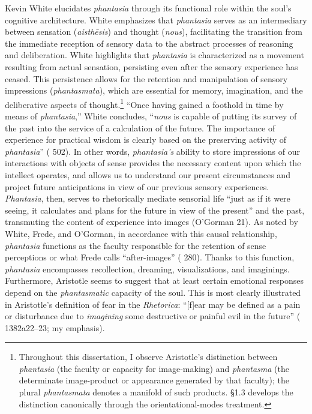 \documentclass{article}
\begin{document}
Kevin White elucidates \textit{phantasia} through its functional role within the soul's cognitive architecture. White emphasizes that \textit{phantasia} serves as an intermediary between sensation (\textit{aisthēsis}) and thought (\textit{nous}), facilitating the transition from the immediate reception of sensory data to the abstract processes of reasoning and deliberation. White highlights that \textit{phantasia} is characterized as a movement resulting from actual sensation, persisting even after the sensory experience has ceased. This persistence allows for the retention and manipulation of sensory impressions (\textit{phantasmata}), which are essential for memory, imagination, and the deliberative aspects of thought.\footnote{Throughout this dissertation, I observe Aristotle's distinction between \textit{phantasia} (the faculty or capacity for image-making) and \textit{phantasma} (the determinate image-product or appearance generated by that faculty); the plural \textit{phantasmata} denotes a manifold of such products. \S1.3 develops the distinction canonically through the orientational-modes treatment.} ``Once having gained a foothold in time by means of \textit{phantasia},'' White concludes, ``\textit{nous} is capable of putting its survey of the past into the service of a calculation of the future. The importance of experience for practical wisdom is clearly based on the preserving activity of \textit{phantasia}'' (\cite{white1985meaning} 502). In other words, \textit{phantasia's} ability to store impressions of our interactions with objects of sense provides the necessary content upon which the intellect operates, and allows us to understand our present circumstances and project future anticipations in view of our previous sensory experiences. \textit{Phantasia}, then, serves to rhetorically mediate sensorial life ``just as if it were seeing, it calculates and plans for the future in view of the present'' and the past, transmuting the content of experience into images (O'Gorman 21). As noted by White, Frede, and O'Gorman, in accordance with this causal relationship, \textit{phantasia} functions as the faculty responsible for the retention of sense perceptions or what Frede calls ``after-images'' (\cite{frede1992cognitive} 280). Thanks to this function, \textit{phantasia} encompasses recollection, dreaming, visualizations, and imaginings. Furthermore, Aristotle seems to suggest that at least certain emotional responses depend on the \textit{phantasmatic} capacity of the soul. This is most clearly illustrated in Aristotle's definition of fear in the \textit{Rhetorica}: ``[f]ear may be defined as a pain or disturbance due to \textit{imagining} some destructive or painful evil in the future'' (\cite{aristotle_rhetoric} 1382a22--23; my emphasis).
\end{document}
